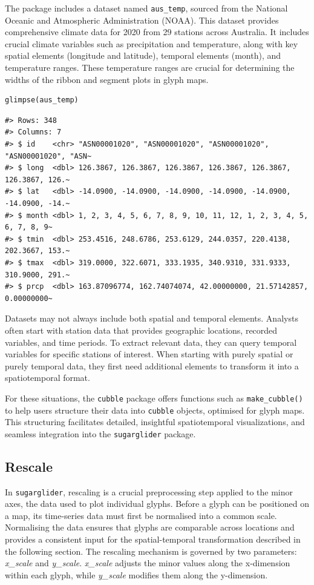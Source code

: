 The package includes a dataset named \texttt{aus\_temp}, sourced from the National Oceanic and Atmospheric Administration (NOAA). This dataset provides comprehensive climate data for 2020 from 29 stations across Australia. It includes crucial climate variables such as precipitation and temperature, along with key spatial elements (longitude and latitude), temporal elements (month), and temperature ranges. These temperature ranges are crucial for determining the widths of the ribbon and segment plots in glyph maps.

\begin{verbatim}
glimpse(aus_temp)
\end{verbatim}

\begin{verbatim}
#> Rows: 348
#> Columns: 7
#> $ id    <chr> "ASN00001020", "ASN00001020", "ASN00001020", "ASN00001020", "ASN~
#> $ long  <dbl> 126.3867, 126.3867, 126.3867, 126.3867, 126.3867, 126.3867, 126.~
#> $ lat   <dbl> -14.0900, -14.0900, -14.0900, -14.0900, -14.0900, -14.0900, -14.~
#> $ month <dbl> 1, 2, 3, 4, 5, 6, 7, 8, 9, 10, 11, 12, 1, 2, 3, 4, 5, 6, 7, 8, 9~
#> $ tmin  <dbl> 253.4516, 248.6786, 253.6129, 244.0357, 220.4138, 202.3667, 153.~
#> $ tmax  <dbl> 319.0000, 322.6071, 333.1935, 340.9310, 331.9333, 310.9000, 291.~
#> $ prcp  <dbl> 163.87096774, 162.74074074, 42.00000000, 21.57142857, 0.00000000~
\end{verbatim}

Datasets may not always include both spatial and temporal elements. Analysts often start with station data that provides geographic locations, recorded variables, and time periods. To extract relevant data, they can query temporal variables for specific stations of interest. When starting with purely spatial or purely temporal data, they first need additional elements to transform it into a spatiotemporal format.

For these situations, the \texttt{cubble} package offers functions such as \texttt{make\_cubble()} to help users structure their data into \texttt{cubble} objects, optimised for glyph maps. This structuring facilitates detailed, insightful spatiotemporal visualizations, and seamless integration into the \texttt{sugarglider} package.

\hypertarget{rescale}{%
\subsection{Rescale}\label{rescale}}

In \texttt{sugarglider}, rescaling is a crucial preprocessing step applied to the minor axes, the data used to plot individual glyphs. Before a glyph can be positioned on a map, its time-series data must first be normalised into a common scale. Normalising the data ensures that glyphs are comparable across locations and provides a consistent input for the spatial-temporal transformation described in the following section. The rescaling mechanism is governed by two parameters: \emph{x\_scale} and \emph{y\_scale}. \emph{x\_scale} adjusts the minor values along the x-dimension within each glyph, while \emph{y\_scale} modifies them along the y-dimension.

